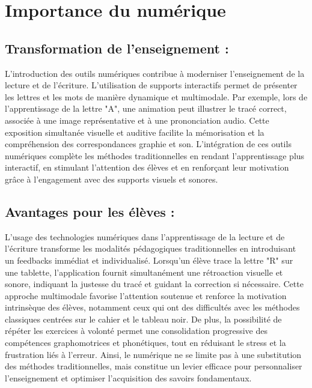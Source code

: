 \documentclass[a4paper,oneside,12pt]{book}
\begin{document}
\section{Importance du numérique}

\subsection{Transformation de l'enseignement :}
L'introduction des outils numériques contribue à moderniser l'enseignement de la lecture et de l'écriture. L'utilisation de supports interactifs permet de présenter les lettres et les mots de manière dynamique et multimodale. Par exemple, lors de l'apprentissage de la lettre "A", une animation peut illustrer le tracé correct, associée à une image représentative et à une prononciation audio. Cette exposition simultanée visuelle et auditive facilite la mémorisation et la compréhension des correspondances graphie et son. L'intégration de ces outils numériques complète les méthodes traditionnelles en rendant l'apprentissage plus interactif, en stimulant l'attention des élèves et en renforçant leur motivation grâce à l'engagement avec des supports visuels et sonores.

\subsection{Avantages pour les élèves :}
L'usage des technologies numériques dans l'apprentissage de la lecture et de l'écriture transforme les modalités pédagogiques traditionnelles en introduisant un feedbacks immédiat et individualisé. Lorsqu'un élève trace la lettre "R" sur une tablette, l'application fournit simultanément une rétroaction visuelle et sonore, indiquant la justesse du tracé et guidant la correction si nécessaire. Cette approche multimodale favorise l'attention soutenue et renforce la motivation intrinsèque des élèves, notamment ceux qui ont des difficultés avec les méthodes classiques centrées sur le cahier et le tableau noir. De plus, la possibilité de répéter les exercices à volonté permet une consolidation progressive des compétences graphomotrices et phonétiques, tout en réduisant le stress et la frustration liés à l'erreur. Ainsi, le numérique ne se limite pas à une substitution des méthodes traditionnelles, mais constitue un levier efficace pour personnaliser l'enseignement et optimiser l'acquisition des savoirs fondamentaux.
\end{document}
